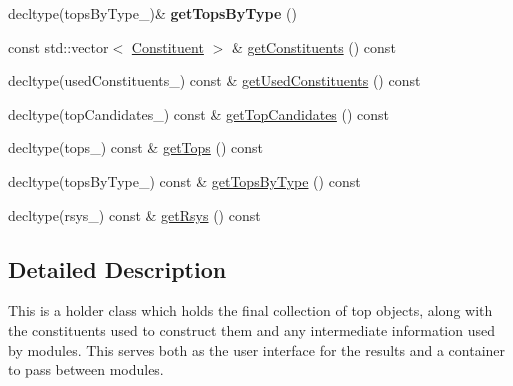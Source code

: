 \begin{DoxyCompactItemize}
\item 
\hypertarget{classTopTaggerResults_aab9cf8928f15dd99d75dee250b0324eb}{decltype(tops\-By\-Type\-\_\-)\& {\bfseries get\-Tops\-By\-Type} ()}\label{classTopTaggerResults_aab9cf8928f15dd99d75dee250b0324eb}

\item 
const std\-::vector$<$ \hyperlink{classConstituent}{Constituent} $>$ \& \hyperlink{classTopTaggerResults_ac1cf35b9f88753c844265a33954c5678}{get\-Constituents} () const 
\item 
decltype(used\-Constituents\-\_\-) const \& \hyperlink{classTopTaggerResults_a515649da0d0d2a39e1f695a384e7f1e9}{get\-Used\-Constituents} () const 
\item 
decltype(top\-Candidates\-\_\-) const \& \hyperlink{classTopTaggerResults_af73f385ccfed5d95edceff6fce6c749b}{get\-Top\-Candidates} () const 
\item 
decltype(tops\-\_\-) const \& \hyperlink{classTopTaggerResults_a247c5fe21e474217d21059d9648367c5}{get\-Tops} () const 
\item 
decltype(tops\-By\-Type\-\_\-) const \& \hyperlink{classTopTaggerResults_ac3e5eb22c271a27aed0aaab94dacb547}{get\-Tops\-By\-Type} () const 
\item 
decltype(rsys\-\_\-) const \& \hyperlink{classTopTaggerResults_a9618cf005aa6b206e70462ceeea5f6c4}{get\-Rsys} () const 
\end{DoxyCompactItemize}


\subsection{Detailed Description}
This is a holder class which holds the final collection of top objects, along with the constituents used to construct them and any intermediate information used by modules. This serves both as the user interface for the results and a container to pass between modules. 

